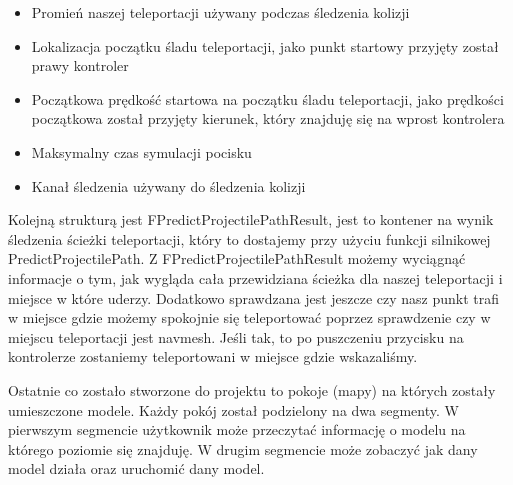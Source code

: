\documentclass[a4paper,12pt,reqno]{article}
\begin{document}
\begin{itemize}
\item Promień naszej teleportacji używany podczas śledzenia kolizji
\item Lokalizacja początku śladu teleportacji, jako punkt startowy przyjęty został prawy kontroler
\item Początkowa prędkość startowa na początku śladu teleportacji, jako prędkości początkowa został przyjęty kierunek, który znajduję się na wprost kontrolera
\item Maksymalny czas symulacji pocisku
\item Kanał śledzenia używany do śledzenia kolizji
\end{itemize}

Kolejną strukturą jest FPredictProjectilePathResult, jest to kontener na wynik śledzenia ścieżki teleportacji, który to dostajemy przy użyciu funkcji silnikowej PredictProjectilePath. Z FPredictProjectilePathResult możemy wyciągnąć informacje o
tym, jak wygląda cała przewidziana ścieżka dla naszej teleportacji i miejsce w które uderzy. Dodatkowo sprawdzana jest jeszcze czy nasz punkt trafi w miejsce gdzie możemy spokojnie się teleportować poprzez sprawdzenie czy w miejscu teleportacji jest navmesh. Jeśli tak, to po puszczeniu przycisku na kontrolerze zostaniemy teleportowani w miejsce gdzie wskazaliśmy.



Ostatnie co zostało stworzone do projektu to pokoje (mapy) na których zostały umieszczone modele. Każdy pokój został podzielony na dwa segmenty. W pierwszym segmencie użytkownik może przeczytać informację o modelu na którego poziomie się znajduję. W drugim segmencie może zobaczyć jak dany model działa oraz uruchomić dany model.
\end{document}

